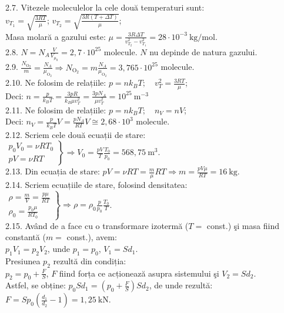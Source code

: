 2.7. Vitezele moleculelor la cele două temperaturi sunt:\\ $v_{T_{1}}=\sqrt{\frac{3 R T}{\mu}}$; \quad $v_{T_{2}}=\sqrt{\frac{3 R(T+\Delta T)}{\mu}}$;\\ Masa molară a gazului este: $\mu=\frac{3 R \Delta T}{v_{T_{2}}^{2}-v_{T_{1}}^{2}}=28 \cdot 10^{-3} \mathrm{~kg} / \mathrm{mol}$.\\

2.8. $N=N_{A} \frac{V}{V_{\mu_{0}}}=2,7 \cdot 10^{25}$ molecule. $N$ nu depinde de natura gazului.\\

2.9. $\frac{N_{\mathrm{O}_{2}}}{m}=\frac{N_{A}}{\mu_{\mathrm{O}_{2}}} \Rightarrow N_{\mathrm{O}_{2}}=m \frac{N_{A}}{\mu_{\mathrm{O}_{2}}}=3,765 \cdot 10^{25}$ molecule.\\

2.10. Ne folosim de relațiile: $p=n k_{B} T; \quad v_{T}^{2}=\frac{3 R T}{\mu}$;\\ Deci: $n=\frac{p}{k_{B} T}=\frac{3 p R}{k_{B} \mu v_{T}^{2}}=\frac{3 p N_{A}}{\mu v_{T}^{2}}=10^{25} \mathrm{~m}^{-3}$\\

2.11. Ne folosim de relațiile: $p=n k_{B} T; \quad n_{V}=n V$;\\ Deci: $n_{V}=\frac{p}{k_{B} T} V=\frac{p N_{A}}{R T} V \cong 2,68 \cdot 10^{3}$ molecule.\\

2.12. Scriem cele două ecuații de stare:\\ $\left.\begin{array}{l}p_{0} V_{0}=\nu R T_{0}\\ p V=\nu R T\end{array}\right\} \Rightarrow V_{0}=\frac{p V}{T} \frac{T_{0}}{p_{0}}=568,75 \mathrm{~m}^{3}$.\\

2.13. Din ecuația de stare: $p V=\nu R T=\frac{m}{\mu} R T \Rightarrow m=\frac{p V \mu}{R T}=16 \mathrm{~kg}$.\\

2.14. Scriem ecuațiile de stare, folosind densitatea:\\ $\left.\begin{array}{l}\rho=\frac{m}{V}=\frac{p \mu}{R T}\\ \rho_{0}=\frac{p_{0} \mu}{R T_{0}}\end{array}\right\} \Rightarrow \rho=\rho_{0} \frac{p}{p_{0}} \frac{T_{0}}{T}$.\\

2.15. Având de a face cu o transformare izotermă ($T=$ const.) şi masa fiind constantă ($m=$ const.), avem:\\ $p_{1} V_{1}=p_{2} V_{2}$, unde $p_{1}=p_{0}$, $V_{1}=S d_{1}$.\\ Presiunea $p_{2}$ rezultă din condiția:\\ $p_{2}=p_{0}+\frac{F}{S}$, $F$ fiind forța ce acționează asupra sistemului şi $V_{2}=S d_{2}$.\\ Astfel, se obține: $p_{0} S d_{1}=\left(p_{0}+\frac{F}{S}\right) S d_{2}$, de unde rezultă:\\ $F=S p_{0}\left(\frac{d_{1}}{d_{2}}-1\right)=1,25 \mathrm{~kN}$.\\

